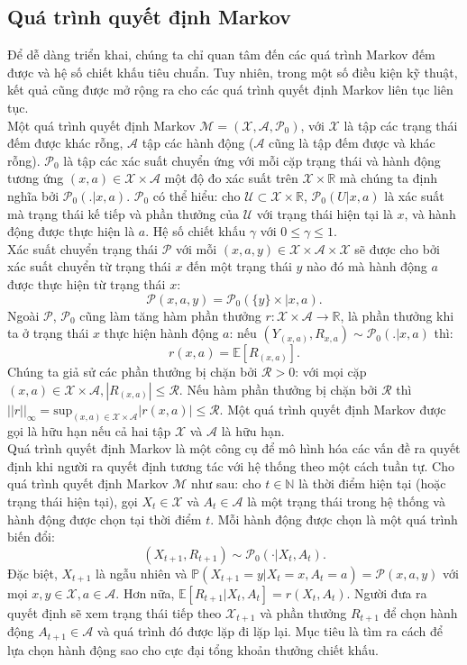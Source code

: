 \documentclass[14pt,a4paper,oneside]{report}		%
\begin{document}
\subsection{Quá trình quyết định Markov}
Để dễ dàng triển khai, chúng ta chỉ quan tâm đến các quá trình Markov đếm được và hệ số chiết khấu tiêu chuẩn. Tuy nhiên, trong một số điều kiện kỹ thuật, kết quả cũng được mở rộng ra cho các quá trình quyết định Markov liên tục liên tục.\\
Một quá trình quyết định Markov $\mathcal{M} = (\mathcal{X},\mathcal{A},\mathcal{P}_0)$, với $\mathcal{X}$ là tập các trạng thái đếm được khác rỗng, $\mathcal{A}$ tập các hành động ($\mathcal{A}$ cũng là tập đếm được và khác rỗng). $\mathcal{P}_0$ là tập các xác suất chuyển ứng với mỗi cặp trạng thái và hành động tương ứng $(x,a) \in \mathcal{X}\times\mathcal{A}$ một độ đo xác suất trên $\mathcal{X}\times\mathbb{R}$ mà chúng ta định nghĩa bởi $\mathcal{P}_0(.|x,a)$. $\mathcal{P}_0$ có thể hiểu: cho $\mathcal{U}\subset\mathcal{X}\times\mathbb{R}$, $\mathcal{P}_0(U|x,a)$ là xác suất mà trạng thái kế tiếp và phần thưởng của $\mathcal{U}$ với trạng thái hiện tại là $x$, và hành động được thực hiện là $a$. Hệ số chiết khấu $\gamma$ với $0\leq \gamma\leq 1$.\\
Xác suất chuyển trạng thái $\mathcal{P}$ với mỗi $(x,a,y)\in\mathcal{X}\times\mathcal{A}\times\mathcal{X}$ sẽ được cho bởi xác suất chuyển từ trạng thái $x$ đến một trạng thái $y$ nào đó mà hành động $a$ được thực hiện từ trạng thái $x$:
$$\mathcal{P}(x,a,y)=\mathcal{P}_0(\{y\}\times|x,a).$$
Ngoài $\mathcal{P}$, $\mathcal{P}_0$ cũng làm tăng hàm phần thưởng $r:\mathcal{X}\times\mathcal{A}\rightarrow\mathbb{R}$, là phần thưởng khi ta ở trạng thái $x$ thực hiện hành động $a$: nếu $(Y_{(x,a)},R_{x,a})\sim\mathcal{P}_0(.|x,a)$ thì:
$$r(x,a)=\mathbb{E}[R_{(x,a)}].$$
Chúng ta giả sử các phần thưởng bị chặn bởi $\mathcal{R} > 0$: với mọi cặp $(x,a) \in \mathcal{X}\times\mathcal{A}, |R_{(x,a)}|\leq\mathcal{R}$. Nếu hàm phần thưởng bị chặn bởi $\mathcal{R}$ thì $||r||_\infty = \text{sup}_{(x,a)\in\mathcal{X}\times\mathcal{A}}|r(x,a)|\leq\mathcal{R}$. Một quá trình quyết định Markov được gọi là hữu hạn nếu cả hai tập $\mathcal{X}$ và $\mathcal{A}$ là hữu hạn.\\
Quá trình quyết định Markov là một công cụ để mô hình hóa các vấn đề ra quyết định khi người ra quyết định tương tác với hệ thống theo một cách tuần tự. Cho quá trình quyết định Markov $\mathcal{M}$ như sau: cho $t\in\mathbb{N}$ là thời điểm hiện tại (hoặc trạng thái hiện tại), gọi $X_t\in\mathcal{X}$ và $A_t\in\mathcal{A}$ là một trạng thái trong hệ thống và hành động được chọn tại thời điểm $t$. Mỗi hành động được chọn là một quá trình biến đổi:
$$(X_{t+1},R_{t+1})\sim\mathcal{P}_0(\cdotp|X_t,A_t).$$
Đặc biệt, $X_{t+1}$ là ngẫu nhiên và $\mathbb{P}(X_{t+1}=y|X_t=x,A_t=a)=\mathcal{P}(x,a,y)$ với mọi $x,y\in\mathcal{X}, a\in\mathcal{A}$. Hơn nữa, $\mathbb{E}[R_{t+1}|X_t,A_t]=r(X_t,A_t)$. Người đưa ra quyết định sẽ xem trạng thái tiếp theo $\mathcal{X}_{t+1}$ và phần thưởng $R_{t+1}$ để chọn hành động $A_{t+1}\in\mathcal{A}$ và quá trình đó được lặp đi lặp lại. Mục tiêu là tìm ra cách để lựa chọn hành động sao cho cực đại tổng khoản thưởng chiết khấu.\\
\end{document}
